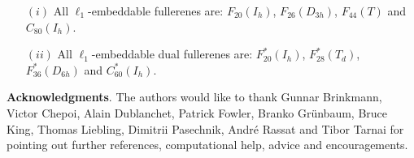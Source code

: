 \begin{conjecture}$\:$
\begin{itemize}
\item[$(i)$] All $\ell_1$-embeddable fullerenes are: 
$F_{20}(I_h)$, $F_{26}(D_{3h})$, $F_{44}(T)$ and $C_{80}(I_h)$.
\item[$(ii)$] All $\ell_1$-embeddable dual fullerenes are: 
$F^*_{20}(I_h)$, $F^*_{28}(T_d)$, $F^*_{36}(D_{6h})$ and $C^*_{60}(I_h)$.\\
\end{itemize}

\end{conjecture}



\noindent
{\bf Acknowledgments}.
The authors would like to thank 
{\sc 
Gunnar Brinkmann,
Victor Chepoi, 
Alain Dublanchet,
Patrick Fowler,
Branko Gr\"unbaum,
Bruce King,
Thomas Liebling,
Dimitrii Pasechnik,
Andr\'e Rassat} and 
{\sc Tibor Tarnai} for 
pointing out further references, computational help,
advice and encouragements. 

